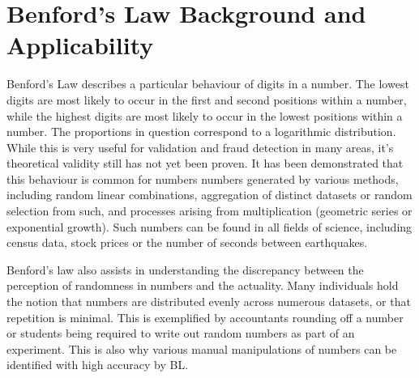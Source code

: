 \chapter{Benford's Law Background and Applicability}


Benford's Law describes a particular behaviour of digits in a number. The lowest digits are most likely to occur in the first and second positions within a number, while the highest digits are most likely to occur in the lowest positions within a number. The proportions in question correspond to a logarithmic distribution. While this is very useful for validation and fraud detection in many areas, it's theoretical validity still has not yet been proven. %
It has been demonstrated that this behaviour is common for numbers numbers generated by various methods, including random linear combinations, aggregation of distinct datasets or random selection from such, and processes arising from multiplication (geometric series or exponential growth). Such numbers can be found in all fields of science, including census data, stock prices or the number of seconds between earthquakes. \cite{Hronova2023} \cite{kossovsky2014benford} %




Benford's law also assists in understanding the discrepancy between the perception of randomness in numbers and the actuality. Many individuals hold the notion that numbers are distributed evenly across numerous datasets, or that repetition is minimal. This is exemplified by accountants rounding off a number or students being required to write out random numbers as part of an experiment. This is also why various manual manipulations of numbers can be identified with high accuracy by BL.\cite{kossovsky2014benford} %


